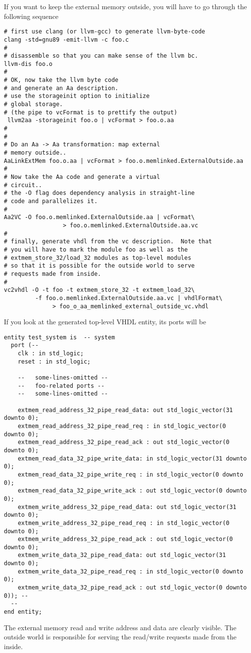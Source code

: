 If you want to keep the external memory
outside, you will have to go through the following sequence
\begin{verbatim}
# first use clang (or llvm-gcc) to generate llvm-byte-code
clang -std=gnu89 -emit-llvm -c foo.c
#
# disassemble so that you can make sense of the llvm bc.
llvm-dis foo.o
#
# OK, now take the llvm byte code
# and generate an Aa description.
# use the storageinit option to initialize
# global storage.
# (the pipe to vcFormat is to prettify the output)
 llvm2aa -storageinit foo.o | vcFormat > foo.o.aa
#
#
# Do an Aa -> Aa transformation: map external
# memory outside..
AaLinkExtMem foo.o.aa | vcFormat > foo.o.memlinked.ExternalOutside.aa
#
# Now take the Aa code and generate a virtual
# circuit..
# the -O flag does dependency analysis in straight-line
# code and parallelizes it.
#
Aa2VC -O foo.o.memlinked.ExternalOutside.aa | vcFormat\
                 > foo.o.memlinked.ExternalOutside.aa.vc
#
# finally, generate vhdl from the vc description.  Note that
# you will have to mark the module foo as well as the
# extmem_store_32/load_32 modules as top-level modules
# so that it is possible for the outside world to serve
# requests made from inside.
#
vc2vhdl -O -t foo -t extmem_store_32 -t extmem_load_32\ 
         -f foo.o.memlinked.ExternalOutside.aa.vc | vhdlFormat\
              > foo_o_aa_memlinked_external_outside_vc.vhdl

\end{verbatim}

If you look at the generated top-level VHDL entity, its ports
will be
\begin{verbatim}
entity test_system is  -- system
  port (--
    clk : in std_logic;
    reset : in std_logic;

    --   some-lines-omitted --
    --   foo-related ports --
    --   some-lines-omitted --

    extmem_read_address_32_pipe_read_data: out std_logic_vector(31 downto 0);
    extmem_read_address_32_pipe_read_req : in std_logic_vector(0 downto 0);
    extmem_read_address_32_pipe_read_ack : out std_logic_vector(0 downto 0);
    extmem_read_data_32_pipe_write_data: in std_logic_vector(31 downto 0);
    extmem_read_data_32_pipe_write_req : in std_logic_vector(0 downto 0);
    extmem_read_data_32_pipe_write_ack : out std_logic_vector(0 downto 0);
    extmem_write_address_32_pipe_read_data: out std_logic_vector(31 downto 0);
    extmem_write_address_32_pipe_read_req : in std_logic_vector(0 downto 0);
    extmem_write_address_32_pipe_read_ack : out std_logic_vector(0 downto 0);
    extmem_write_data_32_pipe_read_data: out std_logic_vector(31 downto 0);
    extmem_write_data_32_pipe_read_req : in std_logic_vector(0 downto 0);
    extmem_write_data_32_pipe_read_ack : out std_logic_vector(0 downto 0)); --
  --
end entity;
\end{verbatim}
The external memory read and write address and data are clearly
visible.   The outside world is responsible for serving the
read/write requests made from the inside.

